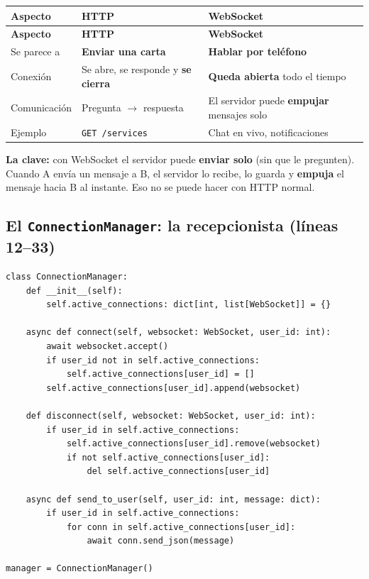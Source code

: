 \documentclass[11pt,a4paper]{article}
\begin{document}
\begin{center}
{\small
\setlength{\tabcolsep}{4pt}
\begin{longtable}{@{}>{\raggedright\arraybackslash}p{2.8cm}>{\raggedright\arraybackslash}p{6.2cm}>{\raggedright\arraybackslash}p{6cm}@{}}
\toprule
\textbf{Aspecto} & \textbf{HTTP} & \textbf{WebSocket} \\
\midrule
\endfirsthead
\toprule
\textbf{Aspecto} & \textbf{HTTP} & \textbf{WebSocket} \\
\midrule
\endhead
Se parece a & \textbf{Enviar una carta} & \textbf{Hablar por teléfono} \\
Conexión & Se abre, se responde y \textbf{se cierra} & \textbf{Queda abierta} todo el tiempo \\
Comunicación & Pregunta $\rightarrow$ respuesta & El servidor puede \textbf{empujar} mensajes solo \\
Ejemplo & \texttt{GET /services} & Chat en vivo, notificaciones \\
\bottomrule
\end{longtable}
}
\end{center}

\textbf{La clave:} con WebSocket el servidor puede \textbf{enviar solo} (sin que le pregunten).
Cuando A envía un mensaje a B, el servidor lo recibe, lo guarda y \textbf{empuja} el mensaje
hacia B al instante. Eso no se puede hacer con HTTP normal.

\subsection{El \texttt{ConnectionManager}: la recepcionista (líneas 12--33)}

\begin{lstlisting}
class ConnectionManager:
    def __init__(self):
        self.active_connections: dict[int, list[WebSocket]] = {}

    async def connect(self, websocket: WebSocket, user_id: int):
        await websocket.accept()
        if user_id not in self.active_connections:
            self.active_connections[user_id] = []
        self.active_connections[user_id].append(websocket)

    def disconnect(self, websocket: WebSocket, user_id: int):
        if user_id in self.active_connections:
            self.active_connections[user_id].remove(websocket)
            if not self.active_connections[user_id]:
                del self.active_connections[user_id]

    async def send_to_user(self, user_id: int, message: dict):
        if user_id in self.active_connections:
            for conn in self.active_connections[user_id]:
                await conn.send_json(message)

manager = ConnectionManager()
\end{lstlisting}
\end{document}
